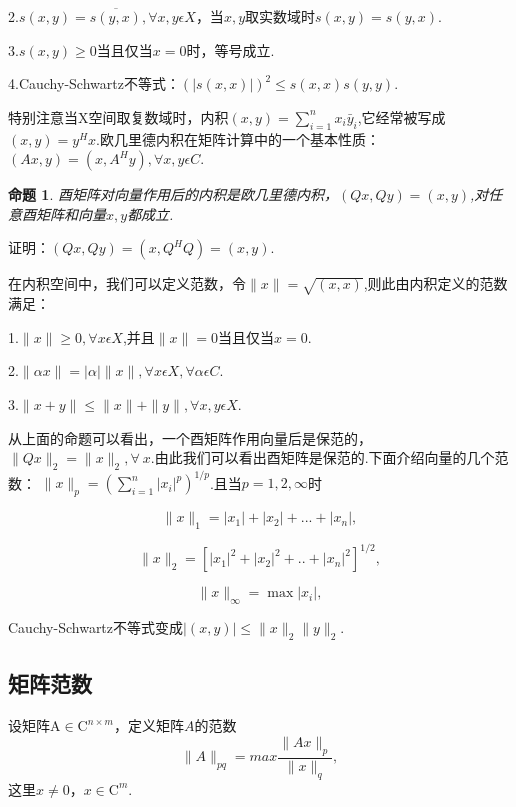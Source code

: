 \documentclass{article}
\begin{document}
2.$s(x,y)=\overline{s(y,x)},\forall x,y\epsilon X$，当$x,y$取实数域时$s(x,y)=s(y,x)$.

3.$s(x,y)\ge 0$当且仅当$x=0$时，等号成立.

4.Cauchy-Schwartz不等式：$(\vert s(x,x)\vert)^2\leqslant s(x,x)s(y,y)$.

特别注意当X空间取复数域时，内积$(x,y)=\sum_{i=1}^n x_i\bar{y}_i$,它经常被写成$(x,y)=y^Hx$.欧几里德内积在矩阵计算中的一个基本性质：$(Ax,y)=(x,A^Hy),\forall x,y\epsilon C$.

\newtheorem{proposition}{命题}
\begin{proposition}
酉矩阵对向量作用后的内积是欧几里德内积，$(Qx,Qy)=(x,y)$,对任意酉矩阵和向量$x,y$都成立.
\end{proposition}

证明：$(Qx,Qy)=(x,Q^HQ)=(x,y)$.

在内积空间中，我们可以定义范数，令$\parallel x\parallel=\sqrt{(x,x)}$,则此由内积定义的范数满足：

1.$\parallel x\parallel \ge 0,\forall x\epsilon X$,并且$\parallel x\parallel=0$当且仅当$x=0$.

2.$\parallel \alpha x\parallel =|\alpha| \parallel x\parallel,\forall x\epsilon X,\forall \alpha \epsilon C$.

3.$\parallel x+y \parallel \leqslant \parallel x\parallel + \parallel y\parallel ,\forall x,y\epsilon X$.

从上面的命题可以看出，一个酉矩阵作用向量后是保范的，$\parallel Qx \parallel_2=\parallel x \parallel_2,\forall ~x$.由此我们可以看出酉矩阵是保范的.下面介绍向量的几个范数：
$\parallel x \parallel_p=(\sum_{i=1}^n |x_i|^p)^{1/p}$.且当$p=1,2,\infty$时

$$\parallel x \parallel_1=|x_1|+|x_2|+...+|x_n|,$$

$$\parallel x \parallel_2=[|x_1|^2+|x_2|^2+..+|x_n|^2]^{1/2},$$

$$\parallel x \parallel_\infty=\max |x_i|,$$

Cauchy-Schwartz不等式变成$|(x,y)|\leqslant \parallel x \parallel_2\parallel y\parallel_2$.

\subsection{矩阵范数}

设矩阵A$\in\mathrm{C}^{n\times m}$，定义矩阵$A$的范数
$$\parallel A\parallel _{pq}=max\frac{\parallel Ax\parallel _p}{\parallel x\parallel _q},$$
这里$x\neq 0$，$x\in\mathrm{C}^{m}$.
\end{document}

